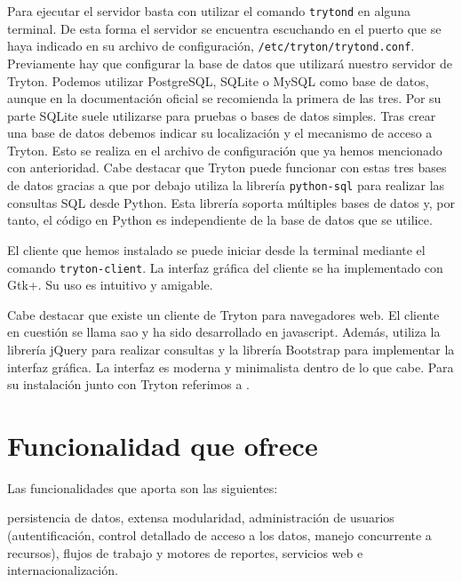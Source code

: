 \documentclass{article}
\begin{document}
Para ejecutar el servidor basta con utilizar el comando \texttt{trytond} en alguna terminal. De esta forma el servidor se encuentra escuchando en el puerto que se haya indicado en su archivo de configuración, \texttt{/etc/tryton/trytond.conf}. Previamente hay que configurar la base de datos que utilizará nuestro servidor de Tryton. Podemos utilizar PostgreSQL, SQLite o MySQL como base de datos, aunque en la documentación oficial se recomienda la primera de las tres. Por su parte SQLite suele utilizarse para pruebas o bases de datos simples. Tras crear una base de datos debemos indicar su localización y el mecanismo de acceso a Tryton. Esto se realiza en el archivo de configuración que ya hemos mencionado con anterioridad. Cabe destacar que Tryton puede funcionar con estas tres bases de datos gracias a que por debajo utiliza la librería \texttt{python-sql} para realizar las consultas SQL desde Python. Esta librería soporta múltiples bases de datos y, por tanto, el código en Python es independiente de la base de datos que se utilice.

El cliente que hemos instalado se puede iniciar desde la terminal mediante el comando \texttt{tryton-client}. La interfaz gráfica del cliente se ha implementado con Gtk+. Su uso es intuitivo y amigable.

Cabe destacar que existe un cliente de Tryton para navegadores web. El cliente en cuestión se llama sao y ha sido desarrollado en javascript. Además, utiliza la librería jQuery para realizar consultas y la librería Bootstrap para implementar la interfaz gráfica. La interfaz es moderna y minimalista dentro de lo que cabe. Para su instalación junto con Tryton referimos a \cite{sao}.



\section{Funcionalidad que ofrece}

Las funcionalidades que aporta son las siguientes:

persistencia de datos, extensa modularidad, administración de usuarios (autentificación, control detallado de acceso a los datos, manejo concurrente a recursos), flujos de trabajo y motores de reportes, servicios web e internacionalización.
\end{document}
